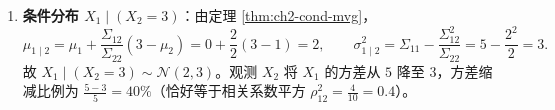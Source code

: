 \begin{enumerate}[label=(\arabic*), leftmargin=1.8em]
\[    = \frac{1}{6}\begin{pmatrix} 2 & 2 \end{pmatrix}
      \begin{pmatrix} 2 & -2 \\ -2 & 5 \end{pmatrix}
      \begin{pmatrix} 2 \\ 2 \end{pmatrix}
    = \frac{1}{6}\begin{pmatrix} 2 & 2 \end{pmatrix}\begin{pmatrix} 0 \\ 6 \end{pmatrix}
    = \frac{12}{6} = 2.
  \]
  （亦可在特征基下核验：$u_1^T\delta = \frac{6}{\sqrt{5}},\; u_2^T\delta = \frac{2}{\sqrt{5}}$，故 $d_M^2 = \frac{36/5}{6} + \frac{4/5}{1} = \frac{6}{5} + \frac{4}{5} = 2$。）
  \item \textbf{条件分布 $X_1 \mid (X_2 = 3)$}：由定理 \ref{thm:ch2-cond-mvg}，
  \[
    \mu_{1\mid 2} = \mu_1 + \frac{\Sigma_{12}}{\Sigma_{22}}(3 - \mu_2) = 0 + \frac{2}{2}(3 - 1) = 2, \qquad
    \sigma_{1\mid 2}^2 = \Sigma_{11} - \frac{\Sigma_{12}^2}{\Sigma_{22}} = 5 - \frac{2^2}{2} = 3.
  \]
  故 $X_1 \mid (X_2 = 3) \sim \mathcal{N}(2, 3)$。观测 $X_2$ 将 $X_1$ 的方差从 $5$ 降至 $3$，方差缩减比例为 $\frac{5 - 3}{5} = 40\%$（恰好等于相关系数平方 $\rho_{12}^2 = \frac{4}{10} = 0.4$）。
\end{enumerate}

